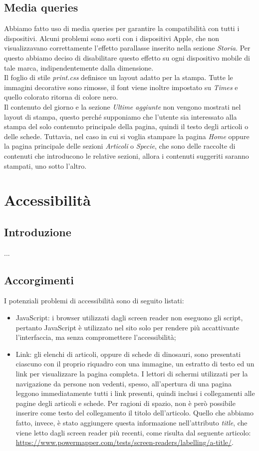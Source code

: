 \documentclass[12pt]{article}
\begin{document}
	\subsection{Media queries}
	Abbiamo fatto uso di media queries per garantire la compatibilità con tutti i dispositivi. Alcuni problemi sono sorti con i dispositivi Apple, che non visualizzavano correttamente l'effetto parallasse inserito nella sezione \textit{Storia}. Per questo abbiamo deciso di disabilitare questo effetto su ogni dispositivo mobile di tale marca, indipendentemente dalla dimensione.\\
	Il foglio di stile \textit{print.css} definisce un layout adatto per la stampa. Tutte le immagini decorative sono rimosse, il font viene inoltre impostato su \textit{Times} e quello colorato ritorna di colore nero.\\
	Il contenuto del giorno e la sezione \textit{Ultime aggiunte} non vengono mostrati nel layout di stampa, questo perché supponiamo che l'utente sia interessato alla stampa del solo contenuto principale della pagina, quindi il testo degli articoli o delle schede. Tuttavia, nel caso in cui si voglia stampare la pagina \textit{Home} oppure la pagina principale delle sezioni \textit{Articoli} o \textit{Specie}, che sono delle raccolte di contenuti che introducono le relative sezioni, allora i contenuti suggeriti saranno stampati, uno sotto l'altro.
	
		
	\section{Accessibilità}
	\subsection{Introduzione}
	...
	
	\subsection{Accorgimenti}
	I potenziali problemi di accessibilità sono di seguito listati:
	\begin{itemize}
		\item JavaScript: i browser utilizzati dagli screen reader non eseguono gli script, pertanto  JavaScript è utilizzato nel sito solo per rendere più accattivante l'interfaccia, ma senza compromettere l'accessibilità;
		\item Link: gli elenchi di articoli, oppure di schede di dinosauri, sono presentati ciascuno con il proprio riquadro con una immagine, un estratto di testo ed un link per visualizzare la pagina completa. I lettori di schermi utilizzati per la navigazione da persone non vedenti, spesso, all'apertura di una pagina leggono immediatamente tutti i link presenti, quindi inclusi i collegamenti alle pagine degli articoli e schede.
		Per ragioni di spazio, non è però possibile inserire come testo del collegamento il titolo dell'articolo. Quello che abbiamo fatto, invece, è stato aggiungere questa informazione nell'attributo \textit{title}, che viene letto dagli screen reader più recenti, come risulta dal seguente articolo: \url{https://www.powermapper.com/tests/screen-readers/labelling/a-title/}.
	\end{itemize}
	
\end{document}
